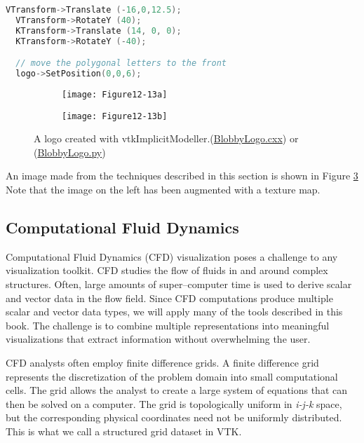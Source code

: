 \begin{lstlisting}[language=C++, caption={Position the letters and move the polygonal logo.}]
  VTransform->Translate (-16,0,12.5);
  VTransform->RotateY (40);
  KTransform->Translate (14, 0, 0);
  KTransform->RotateY (-40);

  // move the polygonal letters to the front
  logo->SetPosition(0,0,6);
\end{lstlisting}

\begin{figure}[htb]
	\begin{subfigure}[h]{0.48\linewidth}
		\texttt{[image: Figure12-13a]}
		\caption*{}
		\label{fig:Figure12-13a}
	\end{subfigure}
	\hfill
	\begin{subfigure}[h]{0.48\linewidth}
		\texttt{[image: Figure12-13b]}
		\caption*{}
		\label{fig:Figure12-13b}
	\end{subfigure}
	\caption{A logo created with vtkImplicitModeller.(\href{https://lorensen.github.io/VTKExamples/site/Cxx/Visualization/BlobbyLogo/}{BlobbyLogo.cxx}) or (\href{https://lorensen.github.io/VTKExamples/site/Python/Visualization/BlobbyLogo/}{BlobbyLogo.py})}\label{fig:Figure12-13}
\end{figure}


An image made from the techniques described in this section is shown
in Figure \ref{fig:Figure12-13}  Note that the image on the left has been augmented with a texture map.

\subsection{Computational Fluid Dynamics}

Computational Fluid Dynamics (CFD) visualization poses a challenge to any visualization toolkit.
CFD studies the flow of fluids in and around complex structures.
Often, large amounts of super--computer time is used to derive scalar and vector data in the flow field.
Since CFD computations produce multiple scalar and vector data types, we will apply many of the tools described in this book.
The challenge is to combine multiple representations into meaningful visualizations that extract information without overwhelming the user.

CFD analysts often employ finite difference grids.
A finite difference grid represents the discretization of the problem domain into small computational cells.
The grid allows the analyst to create a large system of equations that can then be solved on a computer.
The grid is topologically uniform in \emph{i-j-k} space, but the corresponding physical coordinates need not be uniformly distributed.
This is what we call a structured grid dataset in VTK.

